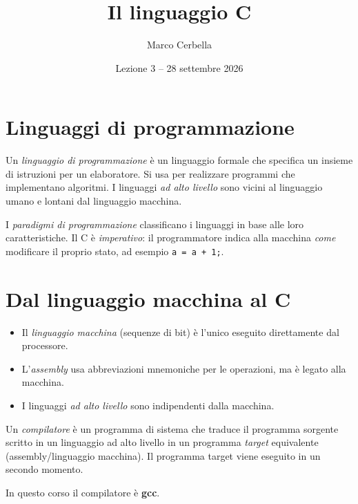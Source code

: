 \documentclass[11pt,a4paper]{article}
\title{Il linguaggio C}
\author{Marco Cerbella}
\date{Lezione 3 -- 28 settembre 2026}
\begin{document}
\maketitle

\section{Linguaggi di programmazione}

\begin{definizione}
Un \emph{linguaggio di programmazione} è un linguaggio formale che specifica un
insieme di istruzioni per un elaboratore. Si usa per realizzare programmi che
implementano algoritmi. I linguaggi \emph{ad alto livello} sono vicini al
linguaggio umano e lontani dal linguaggio macchina.
\end{definizione}

I \emph{paradigmi di programmazione} classificano i linguaggi in base alle loro
caratteristiche. Il C è \emph{imperativo}: il programmatore indica alla
macchina \emph{come} modificare il proprio stato, ad esempio
\lstinline|a = a + 1;|.

\section{Dal linguaggio macchina al C}

\begin{itemize}
    \item Il \emph{linguaggio macchina} (sequenze di bit) è l'unico eseguito
          direttamente dal processore.
    \item L'\emph{assembly} usa abbreviazioni mnemoniche per le operazioni,
          ma è legato alla macchina.
    \item I linguaggi \emph{ad alto livello} sono indipendenti dalla macchina.
\end{itemize}

\begin{definizione}
Un \emph{compilatore} è un programma di sistema che traduce il programma
sorgente scritto in un linguaggio ad alto livello in un programma
\emph{target} equivalente (assembly/linguaggio macchina). Il programma target
viene eseguito in un secondo momento.
\end{definizione}

In questo corso il compilatore è \textbf{gcc}.

\begin{center}
\end{center}
\end{document}
